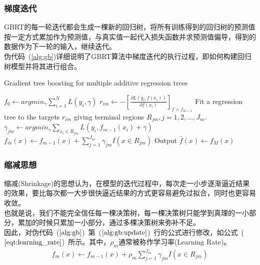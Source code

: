 \documentclass[a4paper,11pt,         %
               ]{article}
\begin{document}
\subsubsection{梯度迭代}

GBRT的每一轮迭代都会生成一棵新的回归树，将所有训练得到的回归树的预测值按一定方式累加作为预测值，与真实值一起代入损失函数并求预测值偏导，得到的数据作为下一轮的输入，继续迭代。 \\

伪代码~(\ref{alg:gb})详细说明了GBRT算法中梯度迭代的执行过程，即如何构建回归树模型并将其进行组合。

\begin{algorithm}
	\caption{Gradient tree boosting for multiple additive regression trees}
	\label{alg:gb}
	\begin{algorithmic}[1] %
	\State $f_{0} \gets argmin_{\gamma} \sum_{i = 1}^{N} L \left ( y_{i}, \gamma\right )$
			\State $r_{im} \gets -\left [ \frac{\partial L\left ( y_{i}, f\left ( x_{i} \right ) \right )}{\partial f\left ( x_{i} \right )} \right ]_{f=f_{m-1}}$			
		\EndFor
		\State Fit a regression tree to the targets $r_{im}$ giving terminal regions $R_{jm}, j = 1,2,...,J_{m}$.
			\State $\gamma_{jm} \gets argmin_{\gamma} \sum_{x_{i} \in R_{jm}} L\left ( y_{i},f_{m-1}\left ( x_{i} \right ) + \gamma \right )$
		\EndFor
		\State $f_{m}\left ( x \right ) \gets f_{m-1}\left ( x \right ) + \sum_{j=1}^{J_{m}} \gamma_{jm}I\left ( x \in R_{jm} \right )$
		\label{alg:gb:update}
	\EndFor
	\State Output $\hat{f}\left ( x \right ) \gets f_{M}\left ( x \right )$
	\end{algorithmic}
\end{algorithm}

\subsubsection{缩减思想}

缩减(Shrinkage)的思想认为，在模型的迭代过程中，每次走一小步逐渐逼近结果的效果，要比每次都一大步很快逼近结果的方式更容易避免过拟合，同时也更容易收敛。 \\

也就是说，我们不能完全信任每一棵决策树，每一棵决策树只能学到真理的一小部分，累加的时候只累加一小部分，通过多棵决策树来弥补不足。 \\

因此，对伪代码~($\ref{alg:gb}$)~第~($\ref{alg:gb:update}$)~行的公式进行修改，如公式~($\ref{eqt:learning_rate}$)~所示。其中，$\rho_{m}$通常被称作学习率(Learning Rate)。
\begin{eqnarray}
	\label{eqt:learning_rate}
	f_{m}\left ( x \right ) \gets f_{m-1}\left ( x \right ) + \rho_{m} \sum_{j=1}^{J_{m}} \gamma_{jm}I\left ( x \in R_{jm} \right )
\end{eqnarray}
\end{document}
